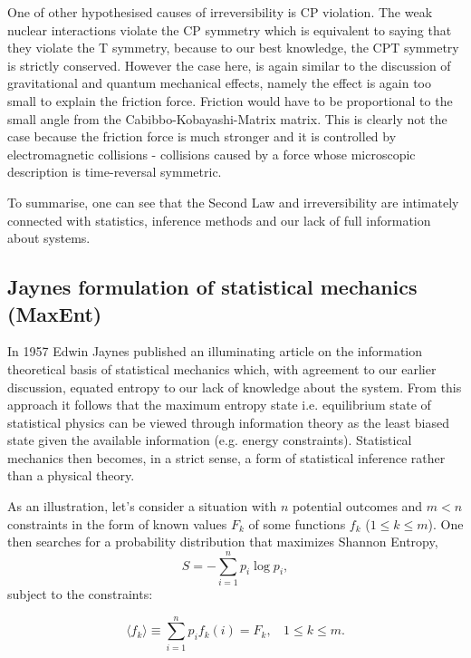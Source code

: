 \documentclass[a4paper,12pt]{article}
\begin{document}
One of other hypothesised causes of irreversibility is CP violation. 
The weak nuclear interactions violate the CP symmetry which is equivalent to saying that they violate the T symmetry, because to our best knowledge, the CPT symmetry is strictly conserved. However the case here, is again similar to the discussion of gravitational and quantum mechanical effects, namely the effect is again too small to explain the friction force. Friction would have to be proportional to the small angle from the Cabibbo-Kobayashi-Matrix matrix.
This is clearly not the case because the friction force is much stronger and it is controlled by electromagnetic collisions - collisions caused by a force whose microscopic description is time-reversal symmetric.
 
To summarise, one can see that the Second Law and irreversibility are intimately connected with statistics, inference methods and our lack of full information about systems.

\subsection{Jaynes formulation of statistical mechanics (MaxEnt)}

In 1957 Edwin Jaynes published an illuminating article on the information theoretical basis of statistical mechanics which, with agreement to our earlier discussion, equated entropy to our lack of knowledge about the system. From this approach it follows that the maximum entropy state i.e. equilibrium state of statistical physics can be viewed through information theory as the least biased state given the available information (e.g. energy constraints).
Statistical mechanics then becomes, in a strict sense, a form of statistical inference rather than a physical theory.

As an illustration, let's consider a situation with $n$ potential outcomes and $m<n$ constraints in the form of known values $F_k$ of some functions $f_k$ ($1 \leq k \leq m$).
One then searches for a probability distribution that maximizes Shannon Entropy,
\begin{equation}
  S=-\sum_{i=1}^n p_i \log p_i,
\end{equation}
subject to the constraints:

\begin{equation}
  \langle f_k \rangle \equiv \sum_{i=1}^n p_i f_k(i)=F_k,\ \ \ \  1\leq k \leq m.
\end{equation}
\end{document}
